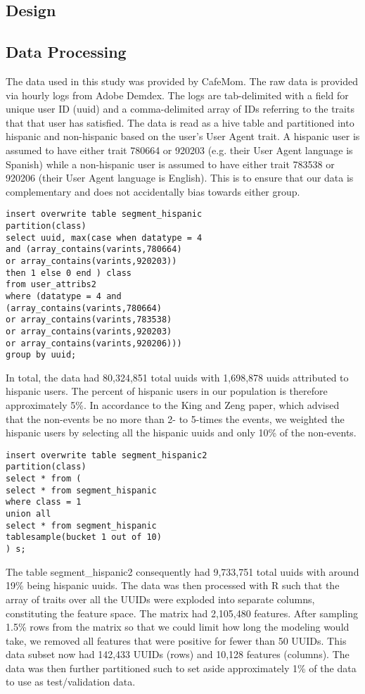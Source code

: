 \documentclass[a4paper]{article}
\begin{document}
\begin{multicols}{2}
\section*{Design}
\subsection*{Data Processing}
The data used in this study was provided by CafeMom. The raw data is provided via hourly logs from Adobe Demdex. The logs are tab-delimited with a field for unique user ID (uuid) and a comma-delimited array of IDs referring to the traits that that user has satisfied. The data is read as a hive table and partitioned into hispanic and non-hispanic based on the user's User Agent trait. A hispanic user is assumed to have either trait 780664 or 920203 (e.g. their User Agent language is Spanish) while a non-hispanic user is assumed to have either trait 783538 or 920206 (their User Agent language is English). This is to ensure that our data is complementary and does not accidentally bias towards either group.

\begin{verbatim}
insert overwrite table segment_hispanic 
partition(class)
select uuid, max(case when datatype = 4 
and (array_contains(varints,780664) 
or array_contains(varints,920203))
then 1 else 0 end ) class
from user_attribs2
where (datatype = 4 and 
(array_contains(varints,780664) 
or array_contains(varints,783538) 
or array_contains(varints,920203) 
or array_contains(varints,920206)))
group by uuid;
\end{verbatim}

In total, the data had 80,324,851 total uuids with 1,698,878 uuids attributed to hispanic users. The percent of hispanic users in our population is therefore approximately 5\%. In accordance to the King and Zeng paper, which advised that the non-events be no more than 2- to 5-times the events, we weighted the hispanic users by selecting all the hispanic uuids and only 10\% of the non-events.
\begin{verbatim}
insert overwrite table segment_hispanic2
partition(class)
select * from ( 
select * from segment_hispanic 
where class = 1 
union all 
select * from segment_hispanic 
tablesample(bucket 1 out of 10)
) s;
\end{verbatim}

The table segment\_hispanic2 consequently had 9,733,751 total uuids with around 19\% being hispanic uuids. The data was then processed with R such that the array of traits over all the UUIDs were exploded into separate columns, constituting the feature space. The matrix had 2,105,480 features. After sampling 1.5\% rows from the matrix so that we could limit how long the modeling would take, we removed all features  that were positive for fewer than 50 UUIDs. This data subset now had 142,433 UUIDs (rows) and 10,128 features (columns). The data was then further partitioned such to set aside approximately 1\% of the data to use as test/validation data.


\end{multicols}
\end{document}
